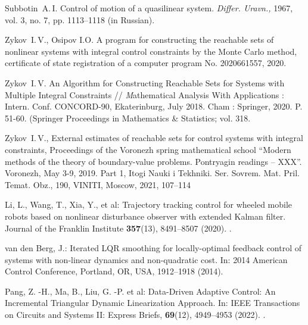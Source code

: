 \documentclass[../main.tex]{subfiles}
\begin{document}
\begin{thebibliography}{99}
Subbotin~A.\,I. Control of motion of a quasilinear system. \emph{Differ. Uravn.,} 1967, vol. 3, no. 7, pp. 1113–1118
(in Russian).

Zykov~I.\,V., Osipov I.O. A program for constructing the reachable sets of nonlinear systems with integral control constraints by the Monte Carlo method, certificate of state registration of a computer program No. 2020661557, 2020.

Zykov~I.\,V. An Algorithm for Constructing Reachable Sets for Systems with Multiple Integral Constraints  // {\textit Mathematical Analysis With Applications : Intern. Conf. CONCORD-90}, Ekaterinburg, July 2018. Cham : Springer, 2020. P. 51-60. (Springer Proceedings in Mathematics \& Statistics; vol. 318. 

Zykov~I.\,V., External estimates of reachable sets for control systems with integral constraints, Proceedings of the Voronezh spring mathematical school “Modern methods of the theory of boundary-value problems. Pontryagin readings – XXX”. Voronezh, May 3-9, 2019. Part 1, Itogi Nauki i Tekhniki. Ser. Sovrem. Mat. Pril. Temat. Obz., 190, VINITI, Moscow, 2021, 107–114 


Li, L., Wang, T., Xia, Y., et al:  Trajectory tracking control for wheeled mobile robots based on nonlinear disturbance observer with extended Kalman filter. Journal of the Franklin Institute \textbf{357}(13), 8491--8507 (2020). .

van den Berg, J.: Iterated LQR smoothing for locally-optimal feedback control of systems with non-linear dynamics and non-quadratic cost. In: 2014 American Control Conference, Portland, OR, USA, 1912--1918 (2014). 

Pang, Z. -H., Ma, B., Liu, G. -P.  et al: Data-Driven Adaptive Control: An Incremental Triangular Dynamic Linearization Approach. In: IEEE Transactions on Circuits and Systems II: Express Briefs, \textbf{69}(12), 4949--4953 (2022). .



\end{thebibliography}
\end{document}
